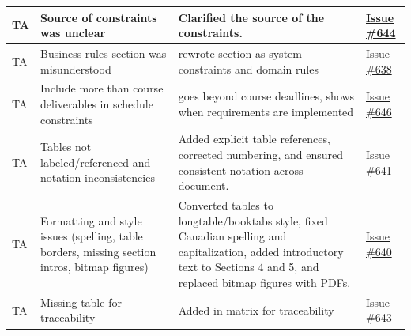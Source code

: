 \documentclass{article}
\begin{document}
\begin{longtable}{|p{2cm}|p{3.5cm}|p{4.5cm}|p{3cm}|}
TA & Source of constraints was unclear  & Clarified the source of the constraints. & \href{https://github.com/4G06-CAPSTONE-2025/Reading4All/issues/644}{Issue \#644} \\ \hline
TA & Business rules section was misunderstood & rewrote section as system constraints and domain rules & \href{https://github.com/4G06-CAPSTONE-2025/Reading4All/issues/638}{Issue \#638} \\ \hline
TA & Include more than course deliverables in schedule constraints & goes beyond course deadlines, shows when requirements are implemented & \href{https://github.com/4G06-CAPSTONE-2025/Reading4All/issues/646}{Issue \#646} \\ \hline
TA & Tables not labeled/referenced and notation inconsistencies & Added explicit table references, corrected numbering, and ensured consistent notation across document. & \href{https://github.com/4G06-CAPSTONE-2025/Reading4All/issues/641}{Issue \#641} \\ \hline
TA & Formatting and style issues (spelling, table borders, missing section intros, bitmap figures) & Converted tables to longtable/booktabs style, fixed Canadian spelling and capitalization, added introductory text to Sections 4 and 5, and replaced bitmap figures with PDFs. & \href{https://github.com/4G06-CAPSTONE-2025/Reading4All/issues/640}{Issue \#640} \\ \hline
TA & Missing table for traceability & Added in matrix for traceability & \href{https://github.com/4G06-CAPSTONE-2025/Reading4All/issues/643}{Issue \#643}
\end{longtable}
\end{document}

